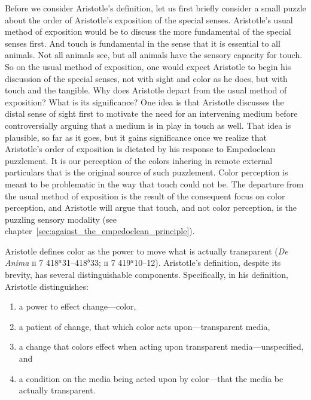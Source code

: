 Before we consider Aristotle's definition, let us first briefly consider a small puzzle about the order of Aristotle's exposition of the special senses. Aristotle's usual method of exposition would be to discuss the more fundamental of the special senses first. And touch is fundamental in the sense that it is essential to all animals. Not all animals see, but all animals have the sensory capacity for touch. So on the usual method of exposition, one would expect Aristotle to begin his discussion of the special senses, not with sight and color as he does, but with touch and the tangible. Why does Aristotle depart from the usual method of exposition? What is its significance? One idea is that Aristotle discusses the distal sense of sight first to motivate the need for an intervening medium before controversially arguing that a medium is in play in touch as well. That idea is plausible, so far as it goes, but it gains significance once we realize that Aristotle's order of exposition is dictated by his response to Empedoclean puzzlement. It is our perception of the colors inhering in remote external particulars that is the original source of such puzzlement. Color perception is meant to be problematic in the way that touch could not be. The departure from the usual method of exposition is the result of the consequent focus on color perception, and Aristotle will argue that touch, and not color perception, is the puzzling sensory modality (see chapter~\ref{sec:against_the_empedoclean_principle}).

Aristotle defines color as the power to move what is actually transparent (\emph{De Anima} \textsc{ii} 7 418\( ^{a} \)31--418\( ^{b} \)33; \textsc{ii} 7 419\( ^{a} \)10--12). Aristotle's definition, despite its brevity, has several distinguishable components. Specifically, in his definition, Aristotle distinguishes:
\begin{enumerate}[(1)]
	\item a power to effect change---color,
	\item a patient of change, that which color acts upon---transparent media,
	\item a change that colors effect when acting upon transparent media---unspecified, and
	\item  a condition on the media being acted upon by color---that the media be actually transparent.
\end{enumerate}

